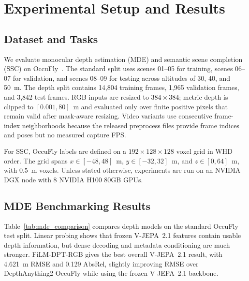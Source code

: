 \newcommand{\fsscrgbdirect}{FSSC RGB ctx DPT, depth FiLM-DPT}
\newcommand{\fsscrgbfilm}{FSSC RGB ctx FiLM-DPT, depth FiLM-DPT}
\newcommand{\fsscvidmvs}{FSSC video ctx DTA-DPT, depth DTA-MVS}
\newcommand{\fsscvidfilmmvs}{FSSC video ctx DTA-DPT, depth DTA-FiLM-MVS}

\section{Experimental Setup and Results}

\subsection{Dataset and Tasks}
We evaluate monocular depth estimation (MDE) and semantic scene completion (SSC) on OccuFly~\cite{gross2026occufly}. The standard split uses scenes 01--05 for training, scenes 06--07 for validation, and scenes 08--09 for testing across altitudes of 30, 40, and 50~m. The depth split contains 14,804 training frames, 1,965 validation frames, and 3,842 test frames. RGB inputs are resized to $384\times384$; metric depth is clipped to $[0.001,80]$~m and evaluated only over finite positive pixels that remain valid after mask-aware resizing. Video variants use consecutive frame-index neighborhoods because the released preprocess files provide frame indices and poses but no measured capture FPS.

For SSC, OccuFly labels are defined on a $192\times128\times128$ voxel grid in WHD order. The grid spans $x\in[-48,48]$~m, $y\in[-32,32]$~m, and $z\in[0,64]$~m, with 0.5~m voxels. Unless stated otherwise, experiments are run on an NVIDIA DGX node with 8 NVIDIA H100 80GB GPUs.

\subsection{MDE Benchmarking Results}

Table~\ref{tab:mde_comparison} compares depth models on the standard OccuFly test split. Linear probing shows that frozen V-JEPA~2.1 features contain usable depth information, but dense decoding and metadata conditioning are much stronger. FiLM-DPT-RGB gives the best overall V-JEPA~2.1 result, with 4.621~m RMSE and 0.129 AbsRel, slightly improving RMSE over DepthAnything2-OccuFly while using the frozen V-JEPA~2.1 backbone.

